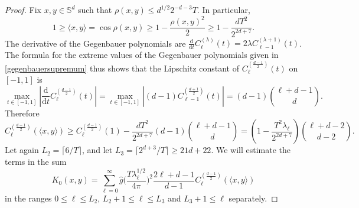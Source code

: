 \documentclass[11pt,a4paper]{article}
\theoremstyle{definition}
\begin{document}
\begin{proof} Fix $x,y \in \mathbb{S}^d$ such that $\rho (x,y) \le d^{1/2} 2^{-d-3} T$. In particular,
\[ 1 \ge \langle x, y \rangle = \cos \rho (x,y) \ge 1-\frac{\rho(x,y)^2}{2} \ge 1-\frac{d T^2}{2^{2d+7}} . \]
The derivative of the Gegenbauer polynomials are \cite[p.\ 81]{SZ} $\frac{\mathrm{d}}{\mathrm{d}t}C_{\ell}^{(\lambda)} (t) = 2 \lambda C_{\ell-1}^{(\lambda+1)}(t)$. The formula for the extreme values of the Gegenbauer polynomials given in \eqref{gegenbauersupremum} thus shows that the Lipschitz constant of $C_{\ell}^{(\frac{d-1}{2})}(t)$ on $[-1,1]$ is
\[ \max_{t \in [-1,1]} \left| \frac{\mathrm{d}}{\mathrm{d}t}C_{\ell}^{(\frac{d-1}{2})} (t) \right| = \max_{t \in [-1,1]} |(d-1) C_{\ell-1}^{(\frac{d+1}{2})}(t)| = (d-1) \binom{\ell+d-1}{d} . \]
Therefore
\begin{equation}\label{cellxybound}
C_{\ell}^{(\frac{d-1}{2})} (\langle x,y \rangle) \ge C_{\ell}^{(\frac{d-1}{2})}(1) - \frac{d T^2}{2^{2d+7}} (d-1) \binom{\ell+d-1}{d} = \left( 1 - \frac{T^2 \lambda_{\ell}}{2^{2d+7}} \right) \binom{\ell+d-2}{d-2} .
\end{equation}
Let again $L_2 = \lceil 6/T \rceil$, and let $L_3 = \lceil 2^{d+3}/T \rceil \ge 21d+22$. We will estimate the terms in the sum
\[ K_0(x,y) = \sum_{\ell=0}^{\infty} \widehat{g} \bigg(\frac{T \lambda_{\ell}^{1/2}}{4 \pi} \bigg)^2 \frac{2\ell+d-1}{d-1} C_{\ell}^{(\frac{d-1}{2})}(\langle x, y \rangle) \]
in the ranges $0 \le \ell \le L_2$, $L_2+1 \le \ell \le L_3$ and $L_3+1 \le \ell$ separately.


\end{proof}
\end{document}
